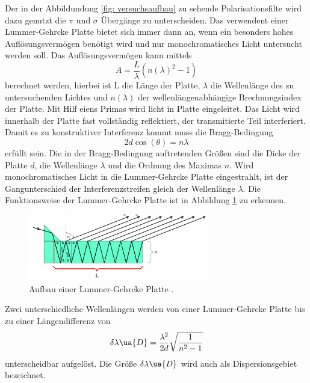 Der in der Abbildundung \ref{fig: versuchsaufbau} zu sehende Polarisationsfilte wird dazu genutzt
die $\pi$ und $\sigma$ Übergänge zu unterscheiden. Das verwendent einer Lummer-Gehrcke Platte
bietet sich immer dann an, wenn ein besonders hohes Auflösungsvermögen benötigt wird
und nur monochromatisches Licht untersucht werden soll.
Das Auflösungsvermögen kann mittels
\begin{equation}
  \label{eq: auflösungsvermoegen_lummer}
  A=\frac{L}{\lambda}(n(\lambda)^2-1)
\end{equation}
berechnet werden, hierbei ist L die Länge der Platte, $\lambda$ die Wellenlänge
des zu untersuchenden Lichtes und $n(\lambda)$ der wellenlängenabhängige
Brechnungsindex der Platte. Mit Hilf eiens Primas wird licht in Platte eingeleitet.
Das Licht wird innerhalb der Platte fast vollständig reflektiert, der transmitierte
Teil interferiert. Damit es zu konstruktiver Interferenz kommt muss die Bragg-Bedingung
\begin{equation*}
  2d\cos(\theta)=n\lambda
\end{equation*}
erfüllt sein. Die in der Bragg-Bedingung auftretenden Größen sind die Dicke der Platte $d$,
die Wellenlänge $\lambda$ und die Ordnung des Maximas $n$.
Wird monochromatisches Licht in die Lummer-Gehrcke Platte eingestrahlt, ist der
Gangunterschied der Interferenzstreifen gleich der Wellenlänge $\lambda$.
Die Funktionsweise der Lummer-Gehrcke Platte ist in Abbildung \ref{fig: lummer} zu erkennen.
\FloatBarrier
\begin{figure}[h]
  \centering
  \includegraphics[width=0.7\textwidth]{pics/lummer.png}
  \caption{Aufbau einer Lummer-Gehrcke Platte \cite{anleitung27}.}
  \label{fig: lummer}
\end{figure}
\FloatBarrier
Zwei unterschiedliche Wellenlängen werden von einer Lummer-Gehrcke Platte bis zu
einer Längendifferenz von
\begin{equation}
  \label{eq: lummer_wellendif}
  \delta \lambda\ua{D}=\frac{\lambda^2}{2 d} \sqrt{\frac{1}{n^2-1}}
\end{equation}
unterscheidbar aufgelöst. Die Größe $\delta \lambda\ua{D}$ wird auch als Dispersionsgebiet
bezeichnet.

